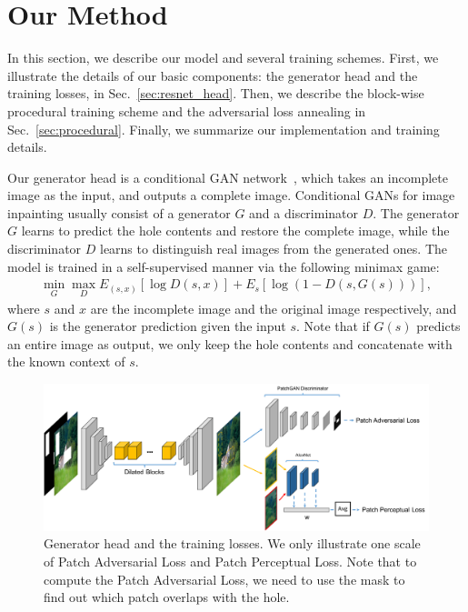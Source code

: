 \section{Our Method}

In this section, we describe our model and several training schemes. First, we illustrate the details of our basic components: the generator head and the training losses, in Sec.~\ref{sec:resnet_head}. Then, we describe the block-wise procedural training scheme and the adversarial loss annealing in Sec.~\ref{sec:procedural}. Finally, we summarize our implementation and training details. 

Our generator head is a conditional GAN network~\cite{mirza2014conditional}, which takes an incomplete image as the input, and outputs a complete image. Conditional GANs for image inpainting usually consist of a generator $G$ and a discriminator $D$. The generator $G$ learns to predict the hole contents and restore the complete image, while the discriminator $D$ learns to distinguish real images from the generated ones. The model is trained in a self-supervised manner via the following minimax game:
\begin{eqnarray}
\min\limits_G \max\limits_D E_{(s,x)}[\log D(s,x)] + E_s[\log (1-D(s,G(s)))],
\end{eqnarray}
where $s$ and $x$ are the incomplete image and the original image respectively, and $G(s)$ is the generator prediction given the input $s$. Note that if $G(s)$ predicts an entire image as output, we only keep the hole contents and concatenate with the known context of $s$.

\begin{figure}[t]
\centering
\small
\includegraphics[width=1\textwidth]{figures/arch.pdf}
\caption{Generator head and the training losses. We only illustrate one scale of Patch Adversarial Loss and Patch Perceptual Loss. Note that to compute the Patch Adversarial Loss, we need to use the mask to find out which patch overlaps with the hole.}
\label{fig:model}
\vspace{-20pt}
\end{figure}

